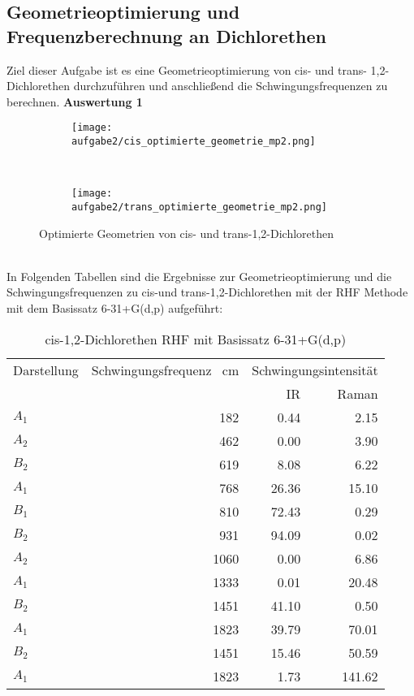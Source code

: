 \documentclass[12pt]{article}
\begin{document}
\begin{onehalfspace}
\section{Geometrieoptimierung und Frequenzberechnung an Dichlorethen}
Ziel dieser Aufgabe ist es eine Geometrieoptimierung von cis- und trans- 1,2-Dichlorethen durchzuführen und anschließend die Schwingungsfrequenzen zu berechnen.
\textbf{Auswertung 1 }\\
\begin{figure}[!hptb]
    \centering
    \begin{subfigure}[b]{0.4\textwidth}
        \texttt{[image: aufgabe2/cis\_optimierte\_geometrie\_mp2.png]}
    \end{subfigure}
    ~ %
    \begin{subfigure}[b]{0.4\textwidth}
        \texttt{[image: aufgabe2/trans\_optimierte\_geometrie\_mp2.png]}
    \end{subfigure}
    \caption{Optimierte Geometrien von cis- und trans-1,2-Dichlorethen}
\end{figure}\\
In Folgenden Tabellen sind die Ergebnisse zur Geometrieoptimierung und die Schwingungsfrequenzen zu cis-und trans-1,2-Dichlorethen mit der RHF Methode mit dem Basissatz 6-31+G(d,p) aufgeführt:\\
\begin{table}[!htpb]
\centering
\caption{cis-1,2-Dichlorethen RHF mit Basissatz 6-31+G(d,p) }
\begin{tabular}{lrrr}
\toprule
Darstellung & 	Schwingungsfrequenz \si{\per\centi\meter} & \multicolumn{2}{c}{Schwingungsintensität} \\
&&IR&Raman\\
\midrule
$A _1$ & 182 & 0.44 & 2.15\\
$A _2$ & 462 & 0.00 & 3.90\\
$B _2$ & 619 & 8.08 & 6.22\\
$A _1$ & 768 & 26.36 & 15.10\\
$B _1$ & 810 & 72.43 & 0.29\\
$B _2$ & 931 & 94.09 & 0.02\\
$A _2$ & 1060 & 0.00 & 6.86\\
$A _1$ & 1333 & 0.01 & 20.48\\
$B _2$ & 1451 & 41.10 & 0.50\\
$A _1$ & 1823 & 39.79 & 70.01\\
$B _2$ & 1451 & 15.46 & 50.59\\
$A _1$ & 1823 & 1.73 & 141.62\\
\bottomrule
\end{tabular}
\end{table}


\end{onehalfspace}
\end{document}
